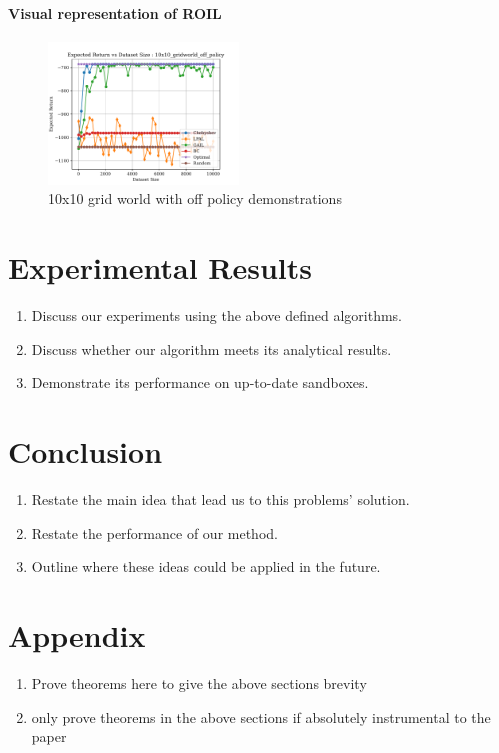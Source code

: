 \documentclass[11pt]{article}
\begin{document}
\paragraph{Visual representation of ROIL}
\begin{figure}[htbp]
	\centering
	\includegraphics[width=0.45\textwidth]{../src/plots/returns/10x10_gridworld_off_policy_returns.pdf}
	\caption{10x10 grid world with off policy demonstrations}
	\label{fig:10x10_gridworld_off_policy_returns}
\end{figure}

\section{Experimental Results}
\begin{enumerate}
	\item Discuss our experiments using the above defined algorithms.
	\item Discuss whether our algorithm meets its analytical results.
	\item Demonstrate its performance on up-to-date sandboxes.
\end{enumerate}

\section{Conclusion}
\begin{enumerate}
	\item Restate the main idea that lead us to this problems' solution.
	\item Restate the performance of our method.
	\item Outline where these ideas could be applied in the future.
\end{enumerate}




\section{Appendix}
\begin{enumerate}
	\item Prove theorems here to give the above sections brevity
	\item only prove theorems in the above sections if absolutely instrumental
	      to the paper
\end{enumerate}
\end{document}
